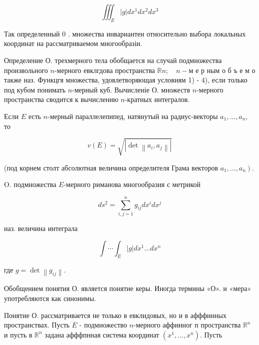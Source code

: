 \documentclass[10pt]{article}
\begin{document}
\[

\iiint_{E}|g| d x^{1} d x^{2} d x^{3}

\]



Так определенный 0 . множества инвариантен относительно выбора локальных координат на рассматриваемом многообразіи.



Определение О. трехмерного тела обобщается на случай подмножества произвольного $n$-мерного евклгдова пространства $\mathbb{R} n ; \quad n-м$ е р ным о б ъ е м о также наз. Функцгя множества, удовлетворяющая условиям 1) - 4), если только под кубом понимать $n$-мерный куб. Вычисленіе О. множеств $n$-мерного пространства сводится к вычислению $n$-кратных интегралов.



Если $E$ есть $n$-мерный параллелепипед, натянутый на радиус-векторы $a_{1}, \ldots, a_{n}$, то



\[

v(E)=\sqrt{\left|\operatorname{det}\left\|a_{i}, a_{j}\right\|\right|}

\]



(под корнем столт абсолютная величина определителя Грама векторов $\left.a_{1}, \ldots, a_{n}\right)$.



O. подмножества $E$-мерного риманова многообразия с метрикой



\[

d s^{2}=\sum_{i, j=1}^{n} g_{i j} d x^{i} d x^{j}

\]



наз. величина интеграла



\[

\int \cdots \int_{E}|g| d x^{1} \ldots d x^{n}

\]



где $g=\operatorname{det}\left\|g_{i j}\right\|$.



Обобщением понятия О. является понятие керы. Иногда термины «О». и «мера» употребляются как синонимы.



Понятие О. рассматривается не только в евклидовых, но и в афффинных пространствах. Пусть $E$ - подмножество $n$-мерного аффинног п пространства $\mathbb{R}^{n}$ и пусть в $\mathbb{R}^{n}$ задана афффпнная система координат $\left(x^{1}, \ldots, x^{n}\right)$. Пусть
\end{document}
